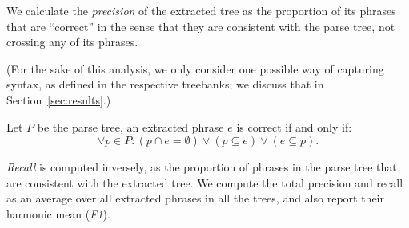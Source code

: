 \documentclass[11pt,a4paper]{article}
\newcommand\ie{i.e.\ }
\def\RR#1{{\color{blue}RR: \it #1}}
\def\DEL#1{{\color{green}SMAZAT: \it #1}}
\def\RR#1{}
\def\DEL#1{}
\begin{document}

We calculate the \emph{precision} of the extracted tree as the proportion of its phrases that are ``correct'' in the sense that they are consistent with the parse tree,
not crossing any of its phrases.
\DEL{An extracted phrase is correct if, for each phrase in the parse tree, one of the phrases is contained in the other, or they are disjoint; \ie,}
(For the sake of this analysis, we only consider one possible way of capturing syntax, as defined in the respective treebanks; we
discuss that
in Section~\ref{sec:results}.)

Let $P$ be the parse tree, an extracted phrase $e$ is correct if and only if:
\begin{equation}
\forall p \in P: (p \cap e = \emptyset) \vee (p \subseteq e) \vee (e \subseteq p).
\end{equation}

\emph{Recall} is computed inversely, as the proportion of phrases in the parse tree that are consistent with the extracted tree.
We compute the total precision and recall as an average over all extracted phrases in all the trees\DEL{ (\ie not as a macro average over the sentences)},
and also report their harmonic mean (\emph{F1}).
\end{document}
